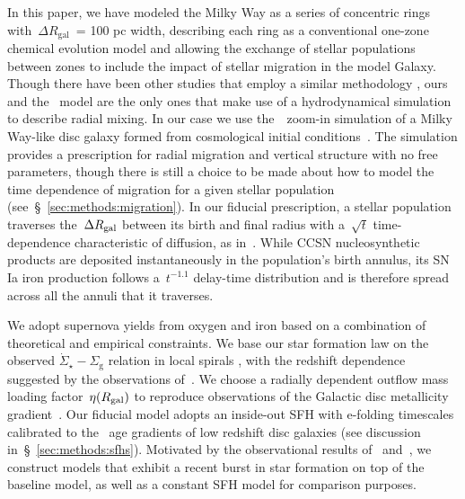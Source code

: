 \documentclass[draft2.tex]{subfiles}
\begin{document}
In this paper, we have modeled the Milky Way as a series of concentric rings 
with~$\Delta R_\text{gal}$~= 100 pc width, describing each ring as a 
conventional one-zone chemical evolution model and allowing the exchange of 
stellar populations between zones to include the impact of stellar migration in 
the model Galaxy. 
Though there have been other studies that employ a similar methodology 
\citep[e.g.][]{Schoenrich2009a, Schoenrich2009b, Kubryk2015a, Kubryk2015b, 
Sharma2020}, ours and the~\citet{Minchev2013, Minchev2014, Minchev2017} model 
are the only ones that make use of a hydrodynamical simulation to describe 
radial mixing. 
In our case we use the~\hsim~zoom-in simulation of a Milky Way-like disc galaxy 
formed from cosmological initial conditions~\citep{Christensen2012, 
Zolotov2012, Loebman2012, Brooks2014, Bird2020}. 
The simulation provides a prescription for radial migration and vertical 
structure with no free parameters, though there is still a choice to be made 
about how to model the time dependence of migration for a given stellar 
population (see~\S~\ref{sec:methods:migration}). 
In our fiducial prescription, a stellar population traverses the~$\Delta R_\text{gal}$ 
between its birth and final radius with a~$\sqrt{t}$ time-dependence 
characteristic of diffusion, as in~\citet{Frankel2018, Frankel2020}. 
While CCSN nucleosynthetic products are deposited instantaneously in the 
population's birth annulus, its SN Ia iron production follows a~$t^{-1.1}$ 
delay-time distribution and is therefore spread across all the annuli that it 
traverses. 
\par 
We adopt supernova yields from oxygen and iron based on a combination of 
theoretical and empirical constraints. 
We base our star formation law on the observed 
$\dot{\Sigma}_\star - \Sigma_\text{g}$ relation in local spirals 
\citep{Bigiel2010, Leroy2013, Krumholz2018a}, with the redshift dependence 
suggested by the observations of~\citet{Tacconi2018}. 
We choose a radially dependent outflow mass loading factor~$\eta(R_\text{gal})$ to 
reproduce observations of the Galactic disc metallicity 
gradient~\citep[e.g.][]{Frinchaboy2013, Hayden2014, Weinberg2019}. 
Our fiducial model adopts an inside-out SFH with e-folding timescales 
calibrated to the~\citet{Sanchez2020} age gradients of low redshift disc 
galaxies (see discussion in~\S~\ref{sec:methods:sfhs}). 
Motivated by the observational results of~\citet{Mor2019} and~\citet{Isern2019}, 
we construct models that exhibit a recent burst in star formation on top of the 
baseline model, as well as a constant SFH model for comparison purposes. 
\end{document}

